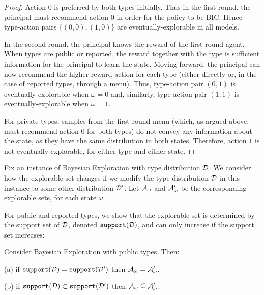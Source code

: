 \begin{proof}
Action 0 is preferred by both types initially. Thus in the first round, the principal must recommend action $0$ in order for the policy to be BIC.  Hence type-action pairs $\{(0,0),(1,0)\}$ are eventually-explorable in all models.

In the second round, the principal knows the reward of the first-round agent.  When types are public or reported, the reward together with the type is sufficient information for the principal to learn the state.  Moving forward, the principal can now recommend the higher-reward action for each type (either directly or, in the case of reported types, through a menu).  Thus, type-action pair $(0,1)$ is eventually-explorable when $\omega=0$ and, similarly, type-action pair $(1,1)$ is eventually-explorable when $\omega=1$.

For private types, samples from the first-round menu (which, as argued above, must recommend action $0$ for both types) do not convey any information about the state, as they have the same distribution in both states. Therefore, action $1$ is not eventually-explorable, for either type and either state.
\end{proof}

Fix an instance of Bayesian Exploration with type distribution $\mathcal{D}$. We consider how the explorable set changes if we modify the type distribution $\mathcal{D}$ in this instance to some other distribution $\mathcal{D}'$. Let $\mathcal{A}_{\omega}$ and $\mathcal{A}_{\omega}'$ be the corresponding explorable sets, for each state $\omega$.


For public and reported types, we show that the explorable set is determined by the support set of $\mathcal{D}$, denoted $\mathtt{support}(\mathcal{D})$, and can only increase if the support set increases:


\begin{claim}\label{cl:statics-diversity-public}
Consider Bayesian Exploration with public types. Then:
\begin{OneLiners}
\item[(a)] if $\mathtt{support}(\mathcal{D})=\mathtt{support}(\mathcal{D}')$ then $\mathcal{A}_{\omega}=\mathcal{A}_{\omega}'$.
\item[(b)] if $\mathtt{support}(\mathcal{D})\subset \mathtt{support}(\mathcal{D}')$ then $\mathcal{A}_{\omega}\subseteq \mathcal{A}_{\omega}'$.
\end{OneLiners}
\end{claim}

